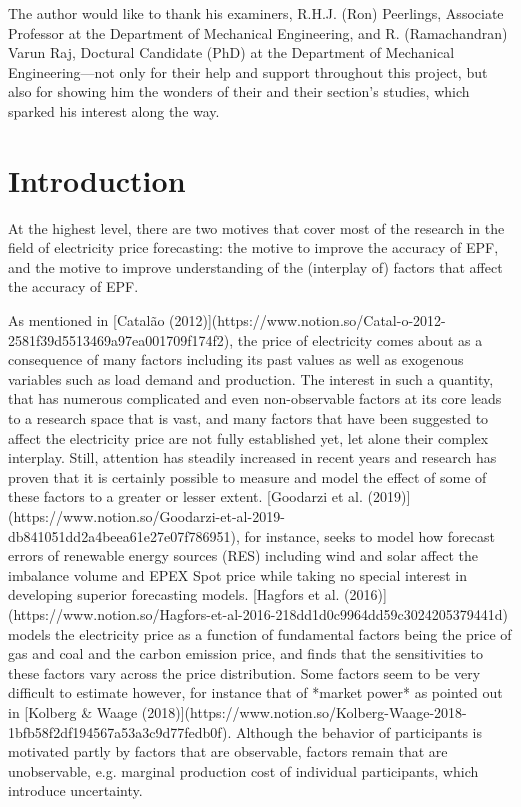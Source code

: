 The author would like to thank his examiners, R.H.J. (Ron) Peerlings, Associate Professor at the Department of Mechanical Engineering, and R. (Ramachandran) Varun Raj, Doctural Candidate (PhD) at the Department of Mechanical Engineering---not only for their help and support throughout this project, but also for showing him the wonders of their and their section's studies, which sparked his interest along the way.
\newpage
\setcounter{tocdepth}{2}
\tableofcontents
\newpage
\section{Introduction}
At the highest level, there are two motives that cover most of the research in the field of electricity price forecasting: the motive to improve the accuracy of EPF, and the motive to improve understanding of the (interplay of) factors that affect the accuracy of EPF.

As mentioned in [Catalão (2012)](https://www.notion.so/Catal-o-2012-2581f39d5513469a97ea001709f174f2), the price of electricity comes about as a consequence of many factors including its past values as well as exogenous variables such as load demand and production. The interest in such a quantity, that has numerous complicated and even non-observable factors at its core leads to a research space that is vast, and many factors that have been suggested to affect the electricity price are not fully established yet, let alone their complex interplay. Still, attention has steadily increased in recent years and research has proven that it is certainly possible to measure and model the effect of some of these factors to a greater or lesser extent. [Goodarzi et al. (2019)](https://www.notion.so/Goodarzi-et-al-2019-db841051dd2a4beea61e27e07f786951), for instance, seeks to model how forecast errors of renewable energy sources (RES) including wind and solar affect the imbalance volume and EPEX Spot price while taking no special interest in developing superior forecasting models. [Hagfors et al. (2016)](https://www.notion.so/Hagfors-et-al-2016-218dd1d0c9964dd59c3024205379441d) models the electricity price as a function of fundamental factors being the price of gas and coal and the carbon emission price, and finds that the sensitivities to these factors vary across the price distribution. Some factors seem to be very difficult to estimate however, for instance that of *market power* as pointed out in [Kolberg & Waage (2018)](https://www.notion.so/Kolberg-Waage-2018-1bfb58f2df194567a53a3c9d77fedb0f). Although the behavior of participants is motivated partly by factors that are observable, factors remain that are unobservable, e.g. marginal production cost of individual participants, which introduce uncertainty.


